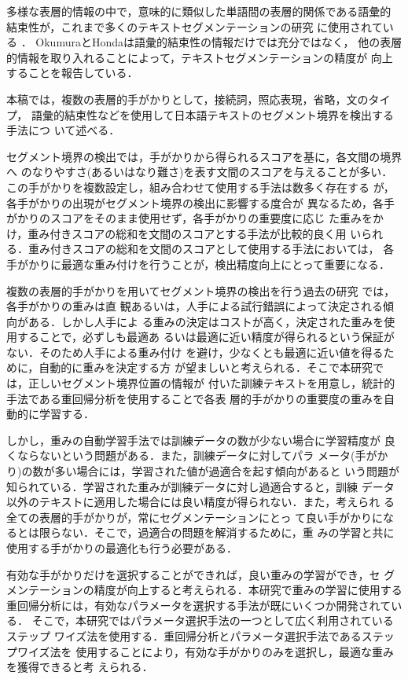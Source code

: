 多様な表層的情報の中で，意味的に類似した単語間の表層的関係である語彙的
結束性\cite{Halliday:76}が，これまで多くのテキストセグメンテーションの研究
に使用されている
\cite{Morris:91,Kozima:93,hearst:94b,okumura:94a,reynar:94}．
OkumuraとHonda\cite{okumura:94a}は語彙的結束性の情報だけでは充分ではなく，
他の表層的情報を取り入れることによって，テキストセグメンテーションの精度が
向上することを報告している．

本稿では，複数の表層的手がかりとして，接続詞，照応表現，省略，文のタイプ，
語彙的結束性などを使用して日本語テキストのセグメント境界を検出する手法につ
いて述べる．

セグメント境界の検出では，手がかりから得られるスコアを基に，各文間の境界へ
のなりやすさ(あるいはなり難さ)を表す文間のスコアを与えることが多い．
この手がかりを複数設定し，組み合わせて使用する手法は数多く存在する
\cite{McRoy:92}が，各手がかりの出現がセグメント境界の検出に影響する度合が
異なるため，各手がかりのスコアをそのまま使用せず，各手がかりの重要度に応じ
た重みをかけ，重み付きスコアの総和を文間のスコアとする手法が比較的良く用
いられる．重み付きスコアの総和を文間のスコアとして使用する手法においては，
各手がかりに最適な重み付けを行うことが，検出精度向上にとって重要になる．

複数の表層的手がかりを用いてセグメント境界の検出を行う過去の研究
\cite{Kurohashi:94,Sumita:92,Cohen:87,Fukumoto1}では，各手がかりの重みは直
観あるいは，人手による試行錯誤によって決定される傾向がある．しかし人手によ
る重みの決定はコストが高く，決定された重みを使用することで，必ずしも最適あ
るいは最適に近い精度が得られるという保証がない．そのため人手による重み付け
を避け，少なくとも最適に近い値を得るために，自動的に重みを決定する方
が望ましいと考えられる．そこで本研究では，正しいセグメント境界位置の情報が
付いた訓練テキストを用意し，統計的手法である重回帰分析を使用することで各表
層的手がかりの重要度の重みを自動的に学習する．

しかし，重みの自動学習手法では訓練データの数が少ない場合に学習精度が
良くならないという問題がある\cite{Akiba:98}．また，訓練データに対してパラ
メータ(手がかり)の数が多い場合には，学習された値が過適合を起す傾向があると
いう問題が知られている．学習された重みが訓練データに対し過適合すると，訓練
データ以外のテキストに適用した場合には良い精度が得られない．また，考えられ
る全ての表層的手がかりが，常にセグメンテーションにとっ
て良い手がかりになるとは限らない．そこで，過適合の問題を解消するために，重
みの学習と共に使用する手がかりの最適化も行う必要がある．

有効な手がかりだけを選択することができれば，良い重みの学習ができ，セ
グメンテーションの精度が向上すると考えられる．本研究で重みの学習に使用する
重回帰分析には，有効なパラメータを選択する手法が既にいくつか開発されている．
そこで，本研究ではパラメータ選択手法の一つとして広く利用されているステップ
ワイズ法を使用する．重回帰分析とパラメータ選択手法であるステップワイズ法を
使用することにより，有効な手がかりのみを選択し，最適な重みを獲得できると考
えられる．

